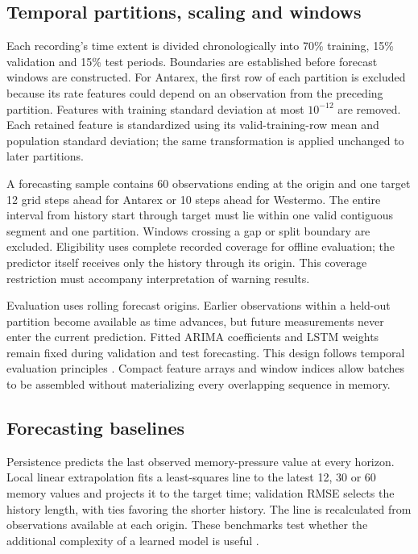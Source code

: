 \documentclass[10pt,a4paper,twocolumn]{article}
\begin{document}
\subsection{Temporal partitions, scaling and windows}

Each recording's time extent is divided chronologically into 70\% training, 15\% validation and 15\% test periods. Boundaries are established before forecast windows are constructed. For Antarex, the first row of each partition is excluded because its rate features could depend on an observation from the preceding partition. Features with training standard deviation at most $10^{-12}$ are removed. Each retained feature is standardized using its valid-training-row mean and population standard deviation; the same transformation is applied unchanged to later partitions.

A forecasting sample contains 60 observations ending at the origin and one target 12 grid steps ahead for Antarex or 10 steps ahead for Westermo. The entire interval from history start through target must lie within one valid contiguous segment and one partition. Windows crossing a gap or split boundary are excluded. Eligibility uses complete recorded coverage for offline evaluation; the predictor itself receives only the history through its origin. This coverage restriction must accompany interpretation of warning results.

Evaluation uses rolling forecast origins. Earlier observations within a held-out partition become available as time advances, but future measurements never enter the current prediction. Fitted ARIMA coefficients and LSTM weights remain fixed during validation and test forecasting. This design follows temporal evaluation principles \cite{ref36,ref37,ref38,ref39}. Compact feature arrays and window indices allow batches to be assembled without materializing every overlapping sequence in memory.

\subsection{Forecasting baselines}

Persistence predicts the last observed memory-pressure value at every horizon. Local linear extrapolation fits a least-squares line to the latest 12, 30 or 60 memory values and projects it to the target time; validation RMSE selects the history length, with ties favoring the shorter history. The line is recalculated from observations available at each origin. These benchmarks test whether the additional complexity of a learned model is useful \cite{ref25}.
\end{document}
